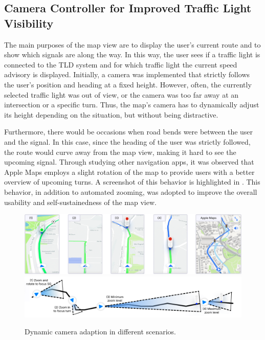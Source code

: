 \subsection{Camera Controller for Improved Traffic Light Visibility}

The main purposes of the map view are to display the user's current route and to show which signals are along the way. In this way, the user sees if a traffic light is connected to the TLD system and for which traffic light the current speed advisory is displayed. Initially, a camera was implemented that strictly follows the user's position and heading at a fixed height. However, often, the currently selected traffic light was out of view, or the camera was too far away at an intersection or a specific turn. Thus, the map's camera has to dynamically adjust its height depending on the situation, but without being distractive.

Furthermore, there would be occasions when road bends were between the user and the signal. In this case, since the heading of the user was strictly followed, the route would curve away from the map view, making it hard to see the upcoming signal. Through studying other navigation apps, it was observed that Apple Maps employs a slight rotation of the map to provide users with a better overview of upcoming turns. A screenshot of this behavior is highlighted in . This behavior, in addition to automated zooming, was adopted to improve the overall usability and self-sustainedness of the map view.

\begin{figure}[htbp]
\centering
\includegraphics[width=\linewidth]{images/camera-controller-1.png}
\includegraphics[width=\linewidth]{images/camera-controller-2.pdf}
\caption{Dynamic camera adaption in different scenarios.}
\label{fig:camera-controller}
\end{figure}

